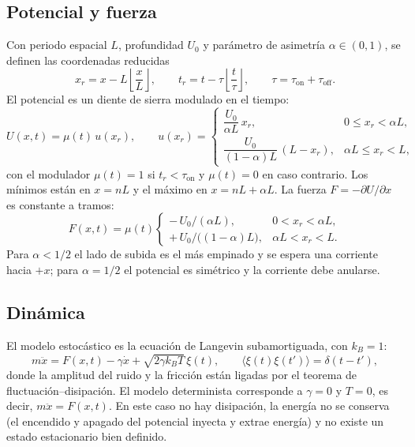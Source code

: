 \documentclass[11pt,a4paper]{article}
\begin{document}
\subsection{Potencial y fuerza}
Con periodo espacial $L$, profundidad $U_0$ y parámetro de asimetría $\alpha\in(0,1)$, se definen las coordenadas reducidas
\begin{equation}
x_r = x - L\left\lfloor \frac{x}{L}\right\rfloor, \qquad
t_r = t - \tau\left\lfloor \frac{t}{\tau}\right\rfloor, \qquad \tau=\tau_{\text{on}}+\tau_{\text{off}} .
\end{equation}
El potencial es un diente de sierra modulado en el tiempo:
\begin{equation}
U(x,t)=\mu(t)\,u(x_r),\qquad
u(x_r)=\begin{cases}
\dfrac{U_0}{\alpha L}\,x_r, & 0\le x_r<\alpha L,\\[2mm]
\dfrac{U_0}{(1-\alpha)L}\,(L-x_r), & \alpha L\le x_r<L,
\end{cases}
\end{equation}
con el modulador $\mu(t)=1$ si $t_r<\tau_{\text{on}}$ y $\mu(t)=0$ en caso contrario. Los mínimos están en $x=nL$ y el máximo en $x=nL+\alpha L$. La fuerza $F=-\partial U/\partial x$ es constante a tramos:
\begin{equation}
F(x,t)=\mu(t)\begin{cases}
-\,U_0/(\alpha L), & 0< x_r<\alpha L,\\
+\,U_0/\big((1-\alpha)L\big), & \alpha L< x_r<L .
\end{cases}
\end{equation}
Para $\alpha<1/2$ el lado de subida es el más empinado y se espera una corriente hacia $+x$; para $\alpha=1/2$ el potencial es simétrico y la corriente debe anularse.

\subsection{Dinámica}
El modelo estocástico es la ecuación de Langevin subamortiguada, con $k_B=1$:
\begin{equation}
m\ddot x = F(x,t)-\gamma\dot x+\sqrt{2\gamma k_BT}\,\xi(t),\qquad
\langle\xi(t)\xi(t')\rangle=\delta(t-t'),
\end{equation}
donde la amplitud del ruido y la fricción están ligadas por el teorema de fluctuación--disipación. El modelo determinista corresponde a $\gamma=0$ y $T=0$, es decir, $m\ddot x=F(x,t)$. En este caso no hay disipación, la energía no se conserva (el encendido y apagado del potencial inyecta y extrae energía) y no existe un estado estacionario bien definido.
\end{document}
